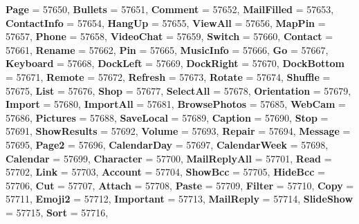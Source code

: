 \begin{DoxyCompactItemize}
{\bfseries Page} = 57650, 
\newline
{\bfseries Bullets} = 57651, 
{\bfseries Comment} = 57652, 
{\bfseries Mail\+Filled} = 57653, 
{\bfseries Contact\+Info} = 57654, 
\newline
{\bfseries Hang\+Up} = 57655, 
{\bfseries View\+All} = 57656, 
{\bfseries Map\+Pin} = 57657, 
{\bfseries Phone} = 57658, 
\newline
{\bfseries Video\+Chat} = 57659, 
{\bfseries Switch} = 57660, 
{\bfseries Contact} = 57661, 
{\bfseries Rename} = 57662, 
\newline
{\bfseries Pin} = 57665, 
{\bfseries Music\+Info} = 57666, 
{\bfseries Go} = 57667, 
{\bfseries Keyboard} = 57668, 
\newline
{\bfseries Dock\+Left} = 57669, 
{\bfseries Dock\+Right} = 57670, 
{\bfseries Dock\+Bottom} = 57671, 
{\bfseries Remote} = 57672, 
\newline
{\bfseries Refresh} = 57673, 
{\bfseries Rotate} = 57674, 
{\bfseries Shuffle} = 57675, 
{\bfseries List} = 57676, 
\newline
{\bfseries Shop} = 57677, 
{\bfseries Select\+All} = 57678, 
{\bfseries Orientation} = 57679, 
{\bfseries Import} = 57680, 
\newline
{\bfseries Import\+All} = 57681, 
{\bfseries Browse\+Photos} = 57685, 
{\bfseries Web\+Cam} = 57686, 
{\bfseries Pictures} = 57688, 
\newline
{\bfseries Save\+Local} = 57689, 
{\bfseries Caption} = 57690, 
{\bfseries Stop} = 57691, 
{\bfseries Show\+Results} = 57692, 
\newline
{\bfseries Volume} = 57693, 
{\bfseries Repair} = 57694, 
{\bfseries Message} = 57695, 
{\bfseries Page2} = 57696, 
\newline
{\bfseries Calendar\+Day} = 57697, 
{\bfseries Calendar\+Week} = 57698, 
{\bfseries Calendar} = 57699, 
{\bfseries Character} = 57700, 
\newline
{\bfseries Mail\+Reply\+All} = 57701, 
{\bfseries Read} = 57702, 
{\bfseries Link} = 57703, 
{\bfseries Account} = 57704, 
\newline
{\bfseries Show\+Bcc} = 57705, 
{\bfseries Hide\+Bcc} = 57706, 
{\bfseries Cut} = 57707, 
{\bfseries Attach} = 57708, 
\newline
{\bfseries Paste} = 57709, 
{\bfseries Filter} = 57710, 
{\bfseries Copy} = 57711, 
{\bfseries Emoji2} = 57712, 
\newline
{\bfseries Important} = 57713, 
{\bfseries Mail\+Reply} = 57714, 
{\bfseries Slide\+Show} = 57715, 
{\bfseries Sort} = 57716, 

\end{DoxyCompactItemize}
